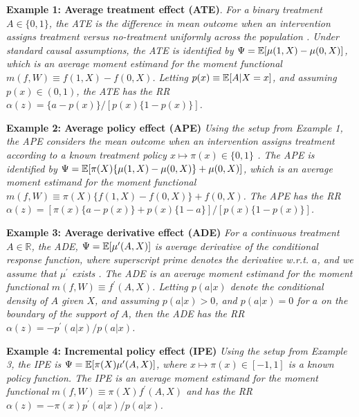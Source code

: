 \textbf{Example 1: Average treatment effect (ATE)}.
\textit{
For a binary treatment $A \in \{0,1\}$, the ATE is the difference in mean outcome when an intervention assigns treatment versus no-treatment uniformly across the population \citep{Rosenbaum1983}. Under standard causal assumptions, the ATE is identified by $\Psi = \mathbb{E}[\mu(1,X) - \mu(0,X)]$, which is an average moment estimand for the moment functional $m(f, W) \equiv f(1, X) - f(0,X)$. Letting $p(x) \equiv \mathbb{E}[A|X=x]$, and assuming $p(x) \in (0,1)$, the ATE has the RR $\alpha(z) = \{a-p(x)\} / [ p(x) \{1-p(x)\}]$.
}

\textbf{Example 2: Average policy effect (APE)}
\textit{
Using the setup from Example 1, the APE considers the mean outcome when an intervention assigns treatment according to a known treatment policy $x\mapsto \pi(x) \in \{0,1\}$ \citep{Dudik2011,VanderLaan2014,Athey2021}. The APE is identified by $\Psi = \mathbb{E}[\pi(X) \{\mu(1,X) - \mu(0,X)\} + \mu(0,X)]$, which is an average moment estimand for the moment functional $m(f, W) \equiv \pi(X) \{f(1,X) - f(0,X)\} + f(0,X)$. The APE has the RR $\alpha(z) = [\pi(x)\{a-p(x)\} + p(x)\{1-a\}]/[ p(x) \{1-p(x)\}]$.
}

\textbf{Example 3: Average derivative effect (ADE)}
\textit{
For a continuous treatment $A \in \mathbb{R}$, the ADE, $\Psi = \mathbb{E}[\mu^\prime(A,X)]$ is average derivative of the conditional response function, where superscript prime denotes the derivative w.r.t. $a$, and we assume that $\mu^\prime$ exists \citep{Hardle1989,Newey1993,Imbens2009,Rothenhausler2019}. The ADE is an average moment estimand for the moment functional $m(f, W) \equiv f^\prime(A, X)$. Letting $p(a|x)$ denote the conditional density of $A$ given $X$, and assuming $p(a|x) > 0$, and $p(a|x) = 0$ for $a$ on the boundary of the support of $A$, then the ADE has the RR $\alpha(z) = -p^\prime(a|x) / p(a|x)$.
}

\textbf{Example 4: Incremental policy effect (IPE)}
\textit{
Using the setup from Example 3, the IPE \citep{Athey2021} is $\Psi = \mathbb{E}[\pi(X)\mu^\prime(A,X)]$, where $x\mapsto \pi(x) \in [-1,1]$ is a known policy function. The IPE is an average moment estimand for the moment functional $m(f, W) \equiv \pi(X)f^\prime(A, X)$ and has the RR $\alpha(z) = -\pi(x)p^\prime(a|x) / p(a|x)$.
}

